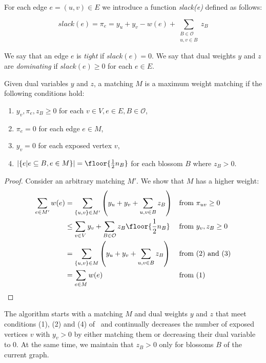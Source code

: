 \begin{defn}[slack]
    For each edge $e = (u, v) \in E$ we introduce a function \emph{slack(e)} defined as follows:

    \[slack(e) = \pi_e = y_u + y_v - w(e) + \sum_{\substack{B \in \mathcal{O} \\ u, v \in B}} z_B\]
\end{defn}

We say that an edge $e$ is \emph{tight} if $slack(e) = 0$. We say that dual weights $y$ and $z$ are \emph{dominating} if $slack(e) \geq 0$ for each $e \in E$.

\begin{theorem}\label{thm:conditions}
Given dual variables $y$ and $z$, a matching $M$ is a maximum weight matching if the following conditions hold:

\begin{enumerate}
    \renewcommand{\labelenumi}{(\arabic{enumi})}
    \item $y_v, \pi_{e}, z_B \geq 0$ for each $v \in V, e \in E, B \in \mathcal{O}$,
    \item $\pi_{e} = 0$ for each edge $e \in M$,
    \item $y_v = 0$ for each exposed vertex $v$,
    \item $|\{e | e \subseteq B, e \in M\}| = \floor{\frac{1}{2}n_B}$ for each blossom $B$ where $z_B > 0$.
\end{enumerate}

\begin{proof}
Consider an arbitrary matching $M'$. We show that $M$ has a higher weight:
\begin{align*}
    \sum_{e \in M'} w(e) &= \sum_{\{u, v\} \in M'} \left( y_u + y_v + \sum_{u, v \in B} z_B \right) && \text{from } \pi_{uv} \geq 0 \\
    &\leq \sum_{v \in V} y_v + \sum_{B \in \mathcal{O}} z_B\floor{\frac{1}{2}n_B} && \text{from } y_v, z_B \geq 0 \\
    &= \sum_{\{u, v\} \in M} \left( y_u + y_v + \sum_{u, v \in B} z_B \right) && \text{from (2) and (3)}\\
    &= \sum_{e \in M} w(e) && \text{from (1)}\\
\end{align*}
\end{proof}

\end{theorem}

The algorithm starts with a matching $M$ and dual weights $y$ and $z$ that meet conditions (1), (2) and (4) of~ and continually decreases the number of exposed vertices $v$ with $y_v > 0$ by either matching them or decreasing their dual variable to $0$. At the same time, we maintain that $z_B > 0$ only for blossoms $B$ of the current graph.

